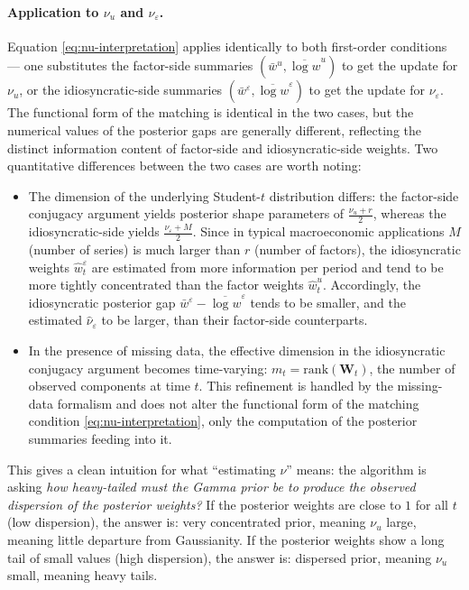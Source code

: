 \documentclass[11pt, a4paper, oneside]{article}
\begin{document}
\paragraph{Application to $\nu_u$ and $\nu_\varepsilon$.}
Equation \eqref{eq:nu-interpretation} applies identically to both
first-order conditions — one substitutes the factor-side summaries
$(\bar{w}^u, \overline{\log w}^u)$ to get the update for $\nu_u$, or
the idiosyncratic-side summaries $(\bar{w}^\varepsilon, \overline{\log w}^\varepsilon)$
to get the update for $\nu_\varepsilon$. The functional form of the
matching is identical in the two cases, but the numerical values of
the posterior gaps are generally different, reflecting the distinct
information content of factor-side and idiosyncratic-side weights.
Two quantitative differences between the two cases are worth noting:
\begin{itemize}[leftmargin=1.5em, itemsep=2pt]
    \item The dimension of the underlying Student-$t$ distribution
          differs: the factor-side conjugacy argument yields posterior
          shape parameters of $\tfrac{\nu_u + r}{2}$, whereas the
          idiosyncratic-side yields $\tfrac{\nu_\varepsilon + M}{2}$.
          Since in typical macroeconomic applications $M$ (number of
          series) is much larger than $r$ (number of factors), the
          idiosyncratic weights $\hat{w}^\varepsilon_t$ are estimated
          from more information per period and tend to be more
          tightly concentrated than the factor weights
          $\hat{w}^u_t$. Accordingly, the idiosyncratic posterior gap
          $\bar{w}^\varepsilon - \overline{\log w}^\varepsilon$ tends
          to be smaller, and the estimated $\hat{\nu}_\varepsilon$ to
          be larger, than their factor-side counterparts.
    \item In the presence of missing data, the effective dimension in
          the idiosyncratic conjugacy argument becomes time-varying:
          $m_t = \mathrm{rank}(\mathbf{W}_t)$, the number of observed
          components at time $t$. This refinement is handled by the
          missing-data formalism and
          does not alter the functional form of the matching
          condition \eqref{eq:nu-interpretation}, only the computation
          of the posterior summaries feeding into it.
\end{itemize}


This gives a clean intuition for what ``estimating $\nu$'' means: the
algorithm is asking \emph{how heavy-tailed must the Gamma prior be to
produce the observed dispersion of the posterior weights?} If the
posterior weights are close to $1$ for all $t$ (low dispersion), the
answer is: very concentrated prior, meaning $\nu_u$ large, meaning
little departure from Gaussianity. If the posterior weights show a
long tail of small values (high dispersion), the answer is: dispersed
prior, meaning $\nu_u$ small, meaning heavy tails.
\end{document}

